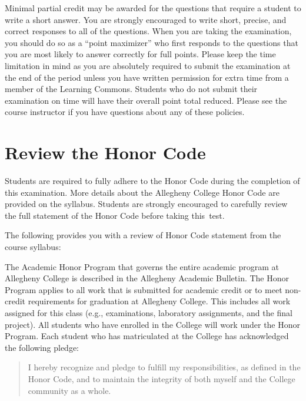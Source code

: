\vspace*{-.05in}
\noindent Minimal partial credit may be awarded for the questions that require a student to write a short answer. You
are strongly encouraged to write short, precise, and correct responses to all of the questions. When you are taking the
examination, you should do so as a ``point maximizer'' who first responds to the questions that you are most likely to
answer correctly for full points. Please keep the time limitation in mind as you are absolutely required to submit the
examination at the end of the period unless you have written permission for extra time from a member of the
Learning Commons. Students who do not submit their examination on time will have their overall point total reduced.
Please see the course instructor if you have questions about any of these policies.

\vspace*{-.1in}
\section*{Review the Honor Code}
\vspace*{-.06in}

\noindent Students are required to fully adhere to the Honor Code during the completion of this examination. More
details about the Allegheny College Honor Code are provided on the syllabus. Students are strongly encouraged to
carefully review the full statement of the Honor Code before taking \mbox{this test}.

\noindent The following provides you with a review of Honor Code statement from the course syllabus:

The Academic Honor Program that governs the entire academic program at Allegheny College is described in the Allegheny
Academic Bulletin.  The Honor Program applies to all work that is submitted for academic credit or to meet non-credit
requirements for graduation at Allegheny College.  This includes all work assigned for this class (e.g., examinations,
laboratory assignments, and the final project).  All students who have enrolled in the College will work under the Honor
Program.  Each student who has matriculated at the College has acknowledged the following pledge:

\vspace*{-.11in}
\begin{quote}
  I hereby recognize and pledge to fulfill my responsibilities, as defined in the Honor Code, and to maintain the
  integrity of both myself and the College community as a whole.
\end{quote}
\vspace*{-.11in}

